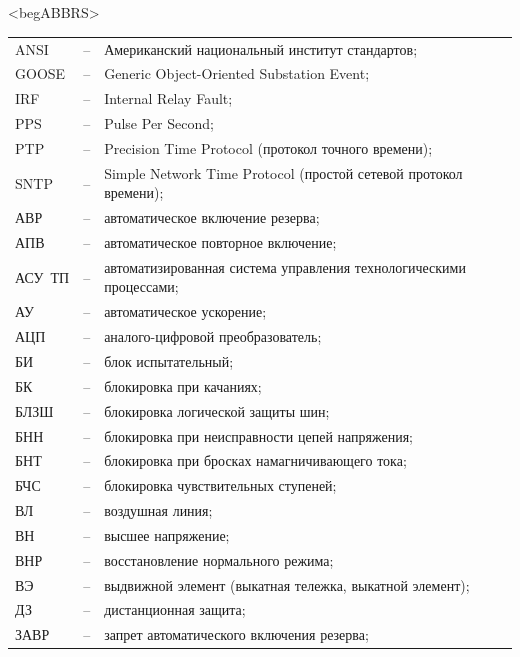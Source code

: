 \color{uniblue}\section*{}
{\color{white}\fontsize{0.1pt}{0.1pt}\selectfont<begABBRS>}
\color{black}
\begin{longtable}{>{\raggedright\arraybackslash}m{2cm}>{\raggedright\arraybackslash}m{0.5cm}>{\raggedright\arraybackslash}m{20cm}}
\endfirsthead\endhead\endfoot\endlastfoot
ANSI & -- & Американский национальный институт стандартов; \\
GOOSE & -- & Generic Object-Oriented Substation Event; \\
IRF & -- & Internal Relay Fault; \\
PPS & -- & Pulse Per Second; \\
PTP & -- & Precision Time Protocol (протокол точного времени); \\
SNTP & -- & Simple Network Time Protocol (простой сетевой протокол времени); \\
АВР & -- & автоматическое включение резерва; \\
АПВ & -- & автоматическое повторное включение; \\
АСУ~ТП & -- & автоматизированная система управления технологическими процессами; \\
АУ & -- & автоматическое ускорение; \\
АЦП & -- & аналого-цифровой преобразователь; \\
БИ & -- & блок испытательный; \\
БК & -- & блокировка при качаниях; \\
БЛЗШ & -- & блокировка логической защиты шин; \\
БНН & -- & блокировка при неисправности цепей напряжения; \\
БНТ & -- & блокировка при бросках намагничивающего тока; \\
БЧС & -- & блокировка чувствительных ступеней; \\
ВЛ & -- & воздушная линия; \\
ВН & -- & высшее напряжение; \\
ВНР & -- & восстановление нормального режима; \\
ВЭ & -- & выдвижной элемент (выкатная тележка, выкатной элемент); \\
ДЗ & -- & дистанционная защита; \\
ЗАВР & -- & запрет автоматического включения резерва; \\

\end{longtable}
